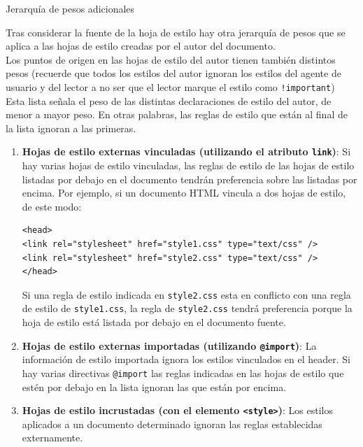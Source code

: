\begin{frame}{Jerarquía de pesos adicionales } %

    Tras considerar la fuente de la hoja de estilo hay otra jerarquía de pesos
    que se aplica a las hojas de estilo creadas por el autor del
    documento. \\[0.1cm]

    Los puntos de origen en las hojas de estilo del autor tienen también
    distintos pesos (recuerde que todos los estilos del autor ignoran los
    estilos del agente de usuario y del lector a no ser que el lector marque el
    estilo como \texttt{!important})\\[0.1cm]

    Esta lista señala el peso de las distintas declaraciones de estilo del
    autor, de menor a mayor peso. En otras palabras, las reglas de estilo que
    están al final de la lista ignoran a las primeras. 
    
    \begin{enumerate}
        \item \textbf{Hojas de estilo externas vinculadas (utilizando el atributo
        \texttt{link})}: Si hay varias hojas de estilo vinculadas, las reglas
        de estilo de las hojas de estilo listadas por debajo en el documento
        tendrán preferencia sobre las listadas por encima. Por ejemplo, si un
        documento HTML vincula a dos hojas de estilo,  de este modo: 
        \begin{lstlisting}
<head>
<link rel="stylesheet" href="style1.css" type="text/css" />
<link rel="stylesheet" href="style2.css" type="text/css" /> 
</head>
        \end{lstlisting}
        Si una regla de estilo indicada en \texttt{style2.css} esta en
        conflicto con una regla de estilo de \texttt{style1.css}, la regla de
        \texttt{style2.css} tendrá preferencia porque la hoja de estilo está
        listada por debajo en el documento fuente. 

        \item  \textbf{Hojas de estilo externas importadas (utilizando
        \texttt{@import})}: La información de estilo importada ignora los
        estilos vinculados en el header. Si hay varias directivas \texttt{@import} las
        reglas indicadas en las hojas de estilo que estén por debajo en la
        lista ignoran las que están por encima. 

        \item \textbf{Hojas de estilo incrustadas (con el elemento
        \texttt{<style>})}:
        Los estilos aplicados a un documento determinado ignoran las
        reglas establecidas externamente. 


\end{enumerate}
\end{frame}
